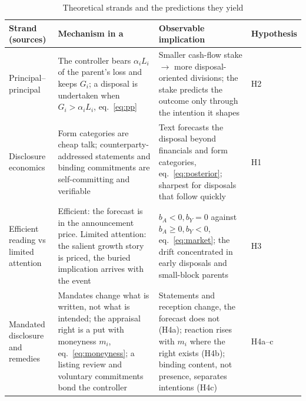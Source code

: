 \begin{table}[htbp]
\centering
\caption{Theoretical strands and the predictions they yield}\label{tab:theory}
{\scriptsize\singlespacing\setlength{\tabcolsep}{4pt}
\begin{tabular}{>{\raggedright\arraybackslash}p{3.0cm}>{\raggedright\arraybackslash}p{5.2cm}>{\raggedright\arraybackslash}p{5.6cm}>{\raggedright\arraybackslash}p{1.3cm}}
\toprule
Strand (sources) & Mechanism in a \captive{} & Observable implication & Hypothesis \\
\midrule
Principal--principal \cite{young2008, johnson2000, claessens2002} & The controller bears $\alpha_i L_i$ of the parent's loss and keeps $G_i$; a disposal is undertaken when $G_i > \alpha_i L_i$, eq.~\eqref{eq:pp} & Smaller cash-flow stake $\rightarrow$ more disposal-oriented divisions; the stake predicts the outcome only through the intention it shapes & H2 \\
Disclosure economics \cite{crawford1982, farrell1996, nanda1991, jensen1976} & Form categories are cheap talk; counterparty-addressed statements and binding commitments are self-committing and verifiable & Text forecasts the disposal beyond financials and form categories, eq.~\eqref{eq:posterior}; sharpest for disposals that follow quickly & H1 \\
Efficient reading vs limited attention \cite{schipper1986, hirshleifer2003, dellavigna2009} & Efficient: the forecast is in the announcement price. Limited attention: the salient growth story is priced, the buried implication arrives with the event & $b_A < 0, b_Y = 0$ against $b_A \ge 0, b_Y < 0$, eq.~\eqref{eq:market}; the drift concentrated in early disposals and small-block parents & H3 \\
Mandated disclosure and remedies \cite{benshahar2014, jiang2016} & Mandates change what is written, not what is intended; the appraisal right is a put with moneyness $m_i$, eq.~\eqref{eq:moneyness}; a listing review and voluntary commitments bond the controller & Statements and reception change, the forecast does not (H4a); reaction rises with $m_i$ where the right exists (H4b); binding content, not presence, separates intentions (H4c) & H4a--c \\
\bottomrule
\end{tabular}}
\end{table}

